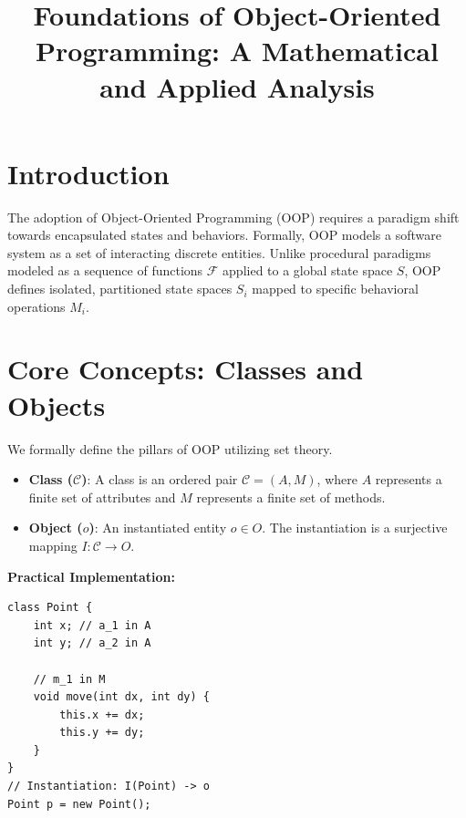 \documentclass[10pt,journal,compsoc]{IEEEtran}
\begin{document}
\title{Foundations of Object-Oriented Programming: A Mathematical and Applied Analysis}


\maketitle
\IEEEdisplaynontitleabstractindextext
\IEEEpeerreviewmaketitle


\section{Introduction}
The adoption of Object-Oriented Programming (OOP) requires a paradigm shift towards encapsulated states and behaviors. Formally, OOP models a software system as a set of interacting discrete entities. Unlike procedural paradigms modeled as a sequence of functions $\mathcal{F}$ applied to a global state space $S$, OOP defines isolated, partitioned state spaces $S_i$ mapped to specific behavioral operations $M_i$. 

\section{Core Concepts: Classes and Objects}
We formally define the pillars of OOP utilizing set theory.
\begin{itemize}
\item \textbf{Class ($\mathcal{C}$)}: A class is an ordered pair $\mathcal{C} = (A, M)$, where $A$ represents a finite set of attributes and $M$ represents a finite set of methods.
\item \textbf{Object ($o$)}: An instantiated entity $o \in O$. The instantiation is a surjective mapping $I : \mathcal{C} \to O$.
\end{itemize}

\textbf{Practical Implementation:}
\begin{verbatim}
class Point {
    int x; // a_1 in A
    int y; // a_2 in A
    
    // m_1 in M
    void move(int dx, int dy) { 
        this.x += dx;
        this.y += dy;
    }
}
// Instantiation: I(Point) -> o
Point p = new Point(); 
\end{verbatim}
\end{document}

